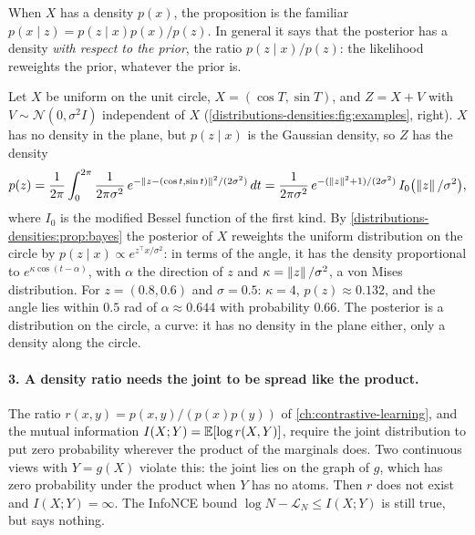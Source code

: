 \begin{notechapter}
When $X$ has a density $p(x)$, the proposition is the familiar
$p(x\mid z) = p(z\mid x)p(x)/p(z)$. In general it says that the posterior has a density \emph{with respect to
the prior}, the ratio $p(z\mid x)/p(z)$: the likelihood reweights the prior, whatever the prior is.

\begin{example}\label{distributions-densities:ex:circle}
Let $X$ be uniform on the unit circle, $X = (\cos T, \sin T)$, and $Z = X + V$ with
$V\sim\mathcal N(0, \sigma^2I)$ independent of $X$ (\cref{distributions-densities:fig:examples}, right). $X$ has no
density in the plane, but $p(z\mid x)$ is the Gaussian density, so $Z$ has the density
\[
  p(z) = \frac1{2\pi}\int_0^{2\pi}\frac{1}{2\pi\sigma^2}\,e^{-\left\|z - (\cos t, \sin t)\right\|^2/(2\sigma^2)}\,dt
  = \frac{1}{2\pi\sigma^2}\,e^{-(\left\|z\right\|^2 + 1)/(2\sigma^2)}\,I_0\bigl(\left\|z\right\|/\sigma^2\bigr),
\]
where $I_0$ is the modified Bessel function of the first kind. By \cref{distributions-densities:prop:bayes} the
posterior of $X$ reweights the uniform distribution on the circle by
$p(z\mid x)\propto e^{z^\top x/\sigma^2}$: in terms of the angle, it has the density proportional to
$e^{\kappa\cos(t - \alpha)}$, with $\alpha$ the direction of $z$ and $\kappa = \left\|z\right\|/\sigma^2$, a von Mises
distribution. For $z = (0.8, 0.6)$ and $\sigma = 0.5$: $\kappa = 4$, $p(z)\approx0.132$, and the angle lies within
$0.5$ rad of $\alpha\approx0.644$ with probability $0.66$. The posterior is a distribution on the circle, a
curve: it has no density in the plane either, only a density along the circle.
\end{example}

\paragraph{3. A density ratio needs the joint to be spread like the product.} The ratio
$r(x, y) = p(x, y)/(p(x)p(y))$ of \cref{ch:contrastive-learning}, and the mutual information
$I(X; Y) = \mathbb{E}[\log r(X, Y)]$, require the joint distribution to put zero probability wherever the
product of the marginals does. Two continuous views with $Y = g(X)$ violate this: the joint lies on the
graph of $g$, which has zero probability under the product when $Y$ has no atoms. Then $r$ does not exist
and $I(X; Y) = \infty$. The InfoNCE bound $\log N - \mathcal L_N\leq I(X;Y)$ is still true, but says nothing.


\end{notechapter}
